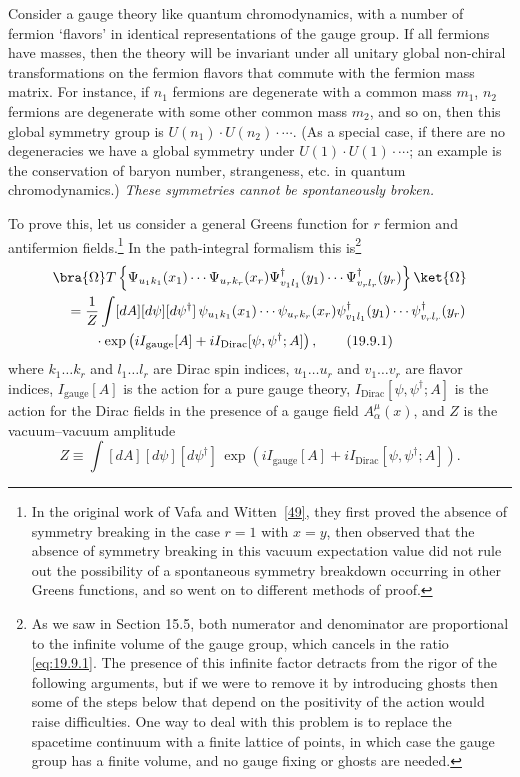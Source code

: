 Consider a gauge theory like quantum chromodynamics, with a number of fermion `flavors' in identical representations of the gauge group. If all fermions have masses, then the theory will be invariant under all unitary global non-chiral transformations on the fermion flavors that commute with the fermion mass matrix. For instance, if $n_1$ fermions are degenerate with a common mass $m_1$, $n_2$ fermions are degenerate with some other common mass $m_2$, and so on, then this global symmetry group is $U(n_1)\cdot U(n_2)\cdot\cdots$. (As a special case, if there are no degeneracies we have a global symmetry under $U(1)\cdot U(1)\cdot\cdots$; an example is the conservation of baryon number, strangeness, etc. in quantum chromodynamics.) \emph{These symmetries cannot be spontaneously broken.}

To prove this, let us consider a general Greens function for $r$ fermion and antifermion fields.\footnote{In the original work of Vafa and Witten~\hyperref[ch19-ref-49]{[49]}, they first proved the absence of symmetry breaking in the case $r=1$ with $x=y$, then observed that the absence of symmetry breaking in this vacuum expectation value did not rule out the possibility of a spontaneous symmetry breakdown occurring in other Greens functions, and so went on to different methods of proof.} In the path-integral formalism this is\footnote{As we saw in Section 15.5, both numerator and denominator are proportional to the infinite volume of the gauge group, which cancels in the ratio \eqref{eq:19.9.1}. The presence of this infinite factor detracts from the rigor of the following arguments, but if we were to remove it by introducing ghosts then some of the steps below that depend on the positivity of the action would raise difficulties. One way to deal with this problem is to replace the spacetime continuum with a finite lattice of points, in which case the gauge group has a finite volume, and no gauge fixing or ghosts are needed.}
\begin{align}
&\bra{\Omega}T\left\{
\Psi_{u_1k_1}(x_1)\cdots\Psi_{u_rk_r}(x_r)
\Psi^\dagger_{v_1l_1}(y_1)\cdots\Psi^\dagger_{v_rl_r}(y_r)
\right\}\ket{\Omega}
\notag\\
&\quad=\frac{1}{Z}\int[dA][d\psi][d\psi^\dagger]\,
\psi_{u_1k_1}(x_1)\cdots\psi_{u_rk_r}(x_r)
\psi^\dagger_{v_1l_1}(y_1)\cdots\psi^\dagger_{v_rl_r}(y_r)
\notag\\
&\qquad\quad{}\cdot
\exp\left(iI_{\mathrm{gauge}}[A]
+iI_{\mathrm{Dirac}}[\psi,\psi^\dagger;A]\right),
\tag{19.9.1}\label{eq:19.9.1}
\end{align}
where $k_1\ldots k_r$ and $l_1\ldots l_r$ are Dirac spin indices, $u_1\ldots u_r$ and $v_1\ldots v_r$ are flavor indices, $I_{\mathrm{gauge}}[A]$ is the action for a pure gauge theory, $I_{\mathrm{Dirac}}[\psi,\psi^\dagger;A]$ is the action for the Dirac fields in the presence of a gauge field $A^\mu_\alpha(x)$, and $Z$ is the vacuum--vacuum amplitude
\begin{equation}
Z\equiv\int[dA][d\psi][d\psi^\dagger]\,
\exp\left(iI_{\mathrm{gauge}}[A]
+iI_{\mathrm{Dirac}}[\psi,\psi^\dagger;A]\right).
\tag{19.9.2}\label{eq:19.9.2}
\end{equation}

